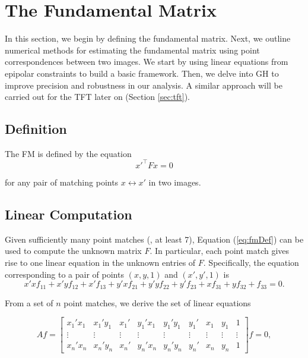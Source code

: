 \section{The Fundamental Matrix}\label{sec:fm}
In this section, we begin by defining the fundamental matrix. Next, we outline numerical methods for estimating the fundamental matrix using point correspondences between two images. We start by using linear equations from epipolar constraints to build a basic framework. Then, we delve into \ac{GH} \cite{12-gauss-helmert} to improve precision and robustness in our analysis. A similar approach will be carried out for the \acs{TFT} later on (Section \ref{sec:tft}).

\subsection{Definition}
The \ac{FM} is defined by the equation
\begin{equation}
	x'^\top Fx = 0
	\label{eq:fmDef}
\end{equation}

for any pair of matching points \( x \leftrightarrow x' \) in two images. 

\subsection{Linear Computation}
Given sufficiently many point matches (\ie, at least 7), Equation (\ref{eq:fmDef}) can be used to compute the unknown matrix \( F \). In particular, each point match gives rise to one linear equation in the unknown entries of \( F \). Specifically, the equation corresponding to a pair of points \( (x, y, 1) \) and \( (x', y', 1) \) is
\begin{equation}
	x'xf_{11} + x'yf_{12} + x'f_{13} + y'xf_{21} + y'yf_{22} + y'f_{23} + xf_{31} + yf_{32} + f_{33} = 0.
\end{equation}

From a set of \( n \) point matches, we derive the set of linear equations

\begin{equation}
	Af = 
	\begin{bmatrix}
	x_1'x_1 & x_1'y_1 & x_1' & y_1'x_1 & y_1'y_1 & y_1' & x_1 & y_1 & 1\\
	\vdots & \vdots & \vdots & \vdots & \vdots & \vdots & \vdots & \vdots & \vdots\\
	x_n'x_n & x_n'y_n & x_n' & y_n'x_n & y_n'y_n & y_n' & x_n & y_n & 1
	\end{bmatrix}
	f = 0,
	\label{eq:LinearFM}
\end{equation}

